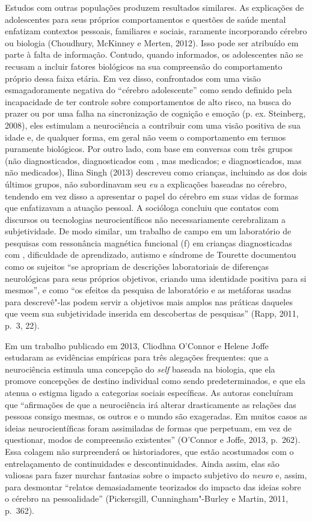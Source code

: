 Estudos com outras populações produzem resultados similares. As
explicações de adolescentes para seus próprios comportamentos e questões
de saúde mental enfatizam contextos pessoais, familiares e sociais,
raramente incorporando cérebro ou biologia (Choudhury, McKinney e
Merten, 2012). Isso pode ser atribuído em parte à falta de informação.
Contudo, quando informados, os adolescentes não se recusam a incluir
fatores biológicos na sua compreensão do comportamento próprio dessa
faixa etária. Em vez disso, confrontados com uma visão esmagadoramente
negativa do ``cérebro adolescente'' como sendo definido pela
incapacidade de ter controle sobre comportamentos de alto risco, na busca
do prazer ou por uma falha na sincronização de cognição e emoção (p. ex.
Steinberg, 2008), eles estimulam a neurociência a contribuir com uma
visão positiva de sua idade e, de qualquer forma, em geral não veem o
comportamento em termos puramente biológicos. Por outro lado, com base
em conversas com três grupos (não diagnosticados, diagnosticados com
, mas medicados; e diagnosticados, mas não medicados), Ilina Singh
(2013) descreveu como crianças, incluindo as dos dois últimos
grupos, não subordinavam seu \emph{eu} a explicações baseadas no
cérebro, tendendo em vez disso a apresentar o papel do cérebro em suas
vidas de formas que enfatizavam a atuação pessoal. A socióloga concluiu
que contatos com discursos ou tecnologias neurocientíficos não
necessariamente cerebralizam a subjetividade. De modo similar, um
trabalho de campo em um laboratório de pesquisas com ressonância
magnética funcional (f) em crianças diagnosticadas com ,
dificuldade de aprendizado, autismo e síndrome de Tourette documentou
como os sujeitos ``se apropriam de descrições laboratoriais de
diferenças neurológicas para seus próprios objetivos, criando uma
identidade positiva para si mesmos'', e como ``os efeitos da pesquisa de
laboratório e as metáforas usadas para descrevê"-las podem servir a
objetivos mais amplos nas práticas daqueles que veem sua subjetividade
inserida em descobertas de pesquisas'' (Rapp, 2011, p.~3, 22).

Em um trabalho publicado em 2013, Cliodhna O'Connor e Helene Joffe
estudaram as evidências empíricas para três alegações frequentes: que a
neurociência estimula uma concepção do \emph{self} baseada na biologia, que ela
promove concepções de destino individual como sendo predeterminados, e
que ela atenua o estigma ligado a categorias sociais específicas. As
autoras concluíram que ``afirmações de que a neurociência irá alterar
drasticamente as relações das pessoas consigo mesmas, os outros e o mundo
são exageradas. Em muitos casos as ideias neurocientíficas foram
assimiladas de formas que perpetuam, em vez de questionar, modos de
compreensão existentes'' (O'Connor e Joffe, 2013, p.~262). Essa colagem
não surpreenderá os historiadores, que estão acostumados com o
entrelaçamento de continuidades e descontinuidades. Ainda assim, elas são
valiosas para fazer murchar fantasias sobre o impacto subjetivo do
\emph{neuro} e, assim, para desmontar ``relatos demasiadamente
teorizados do impacto das ideias sobre o cérebro na pessoalidade''
(Pickersgill, Cunningham"-Burley e Martin, 2011, p.~362).

